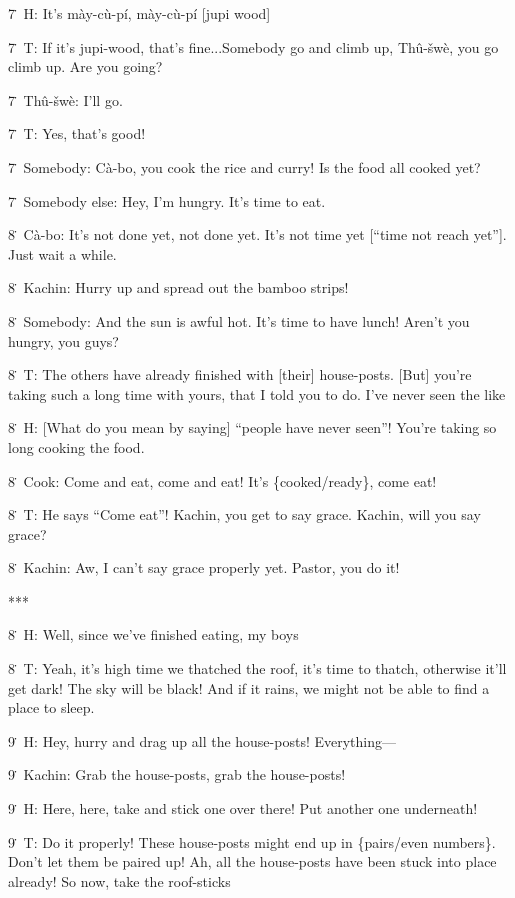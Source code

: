 7\. H: It's mày-cù-pí, mày-cù-pí [jupi wood]

7\. T: If it's jupi-wood, that's fine...Somebody go and climb up, Thû-šwè, you
go climb up.  Are you going?

7\. Thû-šwè: I'll go.

7\. T: Yes, that's good!

7\. Somebody: Cà-bo, you cook the rice and curry!  Is the food all cooked yet?

7\. Somebody else: Hey, I'm hungry.  It's time to eat.

8\. Cà-bo: It's not done yet, not done yet.  It's not time yet [``time not reach
yet''].  Just wait a while.

8\. Kachin: Hurry up and spread out the bamboo strips!

8\. Somebody: And the sun is awful hot.  It's time to have lunch!  Aren't you hungry,
you guys?

8\. T: The others have already finished with [their] house-posts. [But] you're
taking such a long time with yours, that I told you to do.  I've never seen the
like

8\. H: [What do you mean by saying] ``people have never seen''!  You're taking
so long cooking the food.

8\. Cook: Come and eat, come and eat!  It's \{cooked/ready\}, come eat!

8\. T: He says ``Come eat''!  Kachin, you get to say grace.  Kachin, will you say
grace?

8\. Kachin: Aw, I can't say grace properly yet.  Pastor, you do it!

***

8\. H: Well, since we've finished eating, my boys

8\. T: Yeah, it's high time we thatched the roof, it's time to thatch, otherwise
it'll get dark!  The sky will be black!  And if it rains, we might not be able
to find a place to sleep.

9\. H: Hey, hurry and drag up all the house-posts!  Everything---

9\. Kachin: Grab the house-posts, grab the house-posts!

9\. H: Here, here, take and stick one over there!  Put another one underneath!

9\. T: Do it properly!  These house-posts might end up in \{pairs/even numbers\}.
Don't let them be paired up!  Ah, all the house-posts have been stuck into place
already!  So now, take the roof-sticks


